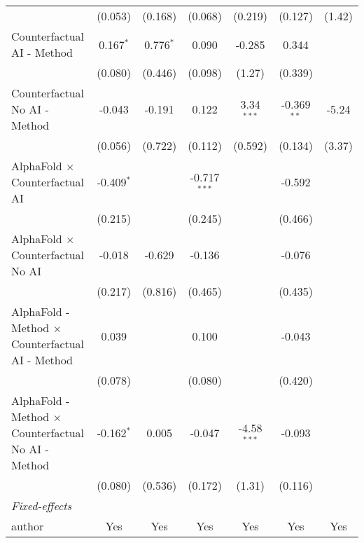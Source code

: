 \begin{tabular}{lcccccc}
                                                              & (0.053)      & (0.168)      & (0.068)        & (0.219)       & (0.127)       & (1.42)\\   
   Counterfactual AI - Method                                 & 0.167$^{*}$  & 0.776$^{*}$  & 0.090          & -0.285        & 0.344         &   \\   
                                                              & (0.080)      & (0.446)      & (0.098)        & (1.27)        & (0.339)       &   \\   
   Counterfactual No AI - Method                              & -0.043       & -0.191       & 0.122          & 3.34$^{***}$  & -0.369$^{**}$ & -5.24\\   
                                                              & (0.056)      & (0.722)      & (0.112)        & (0.592)       & (0.134)       & (3.37)\\   
   AlphaFold $\times$ Counterfactual AI                       & -0.409$^{*}$ &              & -0.717$^{***}$ &               & -0.592        &   \\   
                                                              & (0.215)      &              & (0.245)        &               & (0.466)       &   \\   
   AlphaFold $\times$ Counterfactual No AI                    & -0.018       & -0.629       & -0.136         &               & -0.076        &   \\   
                                                              & (0.217)      & (0.816)      & (0.465)        &               & (0.435)       &   \\   
   AlphaFold - Method $\times$ Counterfactual AI - Method     & 0.039        &              & 0.100          &               & -0.043        &   \\   
                                                              & (0.078)      &              & (0.080)        &               & (0.420)       &   \\   
   AlphaFold - Method $\times$ Counterfactual No AI - Method  & -0.162$^{*}$ & 0.005        & -0.047         & -4.58$^{***}$ & -0.093        &   \\   
                                                              & (0.080)      & (0.536)      & (0.172)        & (1.31)        & (0.116)       &   \\   
   \midrule
   \emph{Fixed-effects}\\
   author                                                     & Yes          & Yes          & Yes            & Yes           & Yes           & Yes\\  

\end{tabular}
